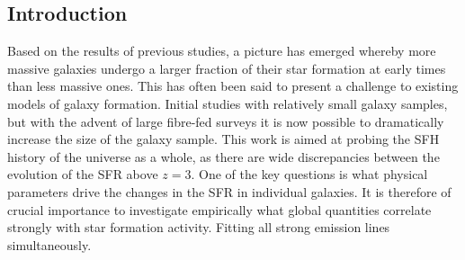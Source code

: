 \documentclass{literature}
\begin{document}
\subsection{Introduction}
Based on the results of previous studies, a picture has emerged whereby more massive galaxies undergo a larger fraction of their star formation at early times than less massive ones. This has often been said to present a challenge to existing models of galaxy formation. Initial studies with relatively small galaxy samples, but with the advent of large fibre-fed surveys it is now possible to dramatically increase the size of the galaxy sample. This work is aimed at probing the SFH history of the universe as a whole, as there are wide discrepancies between the evolution of the SFR above $z = 3$. One of the key questions is what physical parameters drive the changes in the SFR in individual galaxies. It is therefore of crucial importance to investigate empirically what global quantities correlate strongly with star formation activity. Fitting all strong emission lines simultaneously. 




\review
\label{background-review}

\progress
\label{progress}

\summary
\label{summary}

\end{document}
